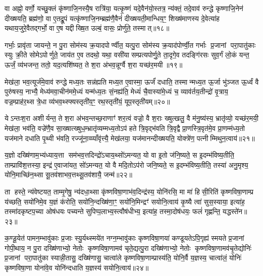 वा अह्नो॒ वर्णो॒ यच्छु॒क्लं कृ॑ष्णाजि॒नस्यै॒ष रात्रि॑या॒ यत्कृ॒ष्णं यदे॒वैन॑यो॒स्तत्र॒ न्य॑क्तं॒ तदे॒वाव॑ रुन्द्धे कृष्णाजि॒नेन॑ दीख्षयति॒ ब्रह्म॑णो॒ वा ए॒तद्रू॒पं यत्कृ॑ष्णाजि॒नम्ब्रह्म॑णै॒वैनं॑ दीख्षयती॒मान्धिय॒ꣳ॒ शिख्ष॑माणस्य दे॒वेत्या॑ह यथाय॒जुरे॒वैतद्गर्भो॒ वा ए॒ष यद्दीख्षि॒त उल्बं॒ वासः॒ प्रोर्णु॑ते॒ तस्मात्॥१८॥

गर्भाः॒ प्रावृ॑ता जायन्ते॒ न पु॒रा सोम॑स्य क्र॒यादपोर्ण्वीत॒ यत्पु॒रा सोम॑स्य क्र॒याद॑पोर्ण्वी॒त गर्भाः प्र॒जानां परा॒पातु॑काः स्युः क्री॒ते सोमेऽपोर्णुते॒ जाय॑त ए॒व तदथो॒ यथा॒ वसी॑यासम्प्रत्यपोर्णु॒ते ता॒दृगे॒व तदङ्गि॑रसः सुव॒र्गं लो॒कं यन्त॒ ऊर्जं॒ व्य॑भजन्त॒ ततो॒ यद॒त्यशि॑ष्यत॒ ते श॒रा अ॑भव॒न्नूर्ग्वै श॒रा यच्छ॑र॒मयी॥१९॥

मेख॑ला॒ भव॒त्यूर्ज॑मे॒वाव॑ रुन्द्धे मध्य॒तः सन्न॑ह्यति मध्य॒त ए॒वास्मा॒ ऊर्जं॑ दधाति॒ तस्मान्मध्य॒त ऊ॒र्जा भु॑ञ्जत ऊ॒र्ध्वं वै पुरु॑षस्य॒ नाभ्यै॒ मेध्य॑मवा॒चीन॑ममे॒ध्यं यन्म॑ध्य॒तः सं॒नह्य॑ति॒ मेध्यं॑ चै॒वास्या॑मे॒ध्यं च॒ व्याव॑र्तय॒तीन्द्रो॑ वृ॒त्राय॒ वज्र॒म्प्राह॑र॒थ्स त्रे॒धा व्य॑भव॒थ्स्फ्यस्तृती॑य॒ꣳ॒ रथ॒स्तृती॑यं॒ यूप॒स्तृती॑यम्॥२०॥

येऽन्तःश॒रा अशीर्यन्त॒ ते श॒रा अ॑भव॒न्तच्छ॒राणाꣳ॑ शर॒त्वं वज्रो॒ वै श॒राः ख्षुत्खलु॒ वै म॑नु॒ष्य॑स्य॒ भ्रातृ॑व्यो॒ यच्छ॑र॒मयी॒ मेख॑ला॒ भव॑ति॒ वज्रे॑णै॒व सा॒ख्षात्ख्षुध॒म्भ्रातृ॑व्यम्मध्य॒तोऽप॑ हते त्रि॒वृद्भ॑वति त्रि॒वृद्वै प्रा॒णस्त्रि॒वृत॑मे॒व प्रा॒णम्म॑ध्य॒तो यज॑माने दधाति पृ॒थ्वी भ॑वति॒ रज्जू॑ना॒व्व्याँवृ॑त्त्यै॒ मेख॑लया॒ यज॑मानन्दीख्षयति॒ योक्त्रे॑ण॒ पत्नीम्मिथुन॒त्वाय॑॥२१॥

य॒ज्ञो दख्षि॑णाम॒भ्य॑ध्याय॒त्ता सम॑भव॒त्तदिन्द्रो॑ऽचाय॒थ्सो॑ऽमन्यत॒ यो वा इ॒तो ज॑नि॒ष्यते॒ स इ॒दम्भ॑विष्य॒तीति॒ ताम्प्रावि॑श॒त्तस्या॒ इन्द्र॑ ए॒वाजा॑यत॒ सो॑ऽमन्यत॒ यो वै मदि॒तोऽप॑रो जनि॒ष्यते॒ स इ॒दम्भ॑विष्य॒तीति॒ तस्या॑ अनु॒मृश्य॒ योनि॒माच्छि॑न॒थ्सा सू॒तव॑शाभव॒त्तथ्सू॒तव॑शायै॒ जन्म॑॥२२॥

ता हस्ते॒ न्य॑वेष्टयत॒ ताम्मृ॒गेषु॒ न्य॑दधा॒थ्सा कृ॑ष्णविषा॒णाभ॑व॒दिन्द्र॑स्य॒ योनि॑रसि॒ मा मा॑ हिसी॒रिति॑ कृष्णविषा॒णाम्प्र य॑च्छति॒ सयो॑निमे॒व य॒ज्ञं क॑रोति॒ सयो॑नि॒न्दख्षि॑णा॒ꣳ॒ सयो॑नि॒मिन्द्रꣳ॑ सयोनि॒त्वाय॑ कृ॒ष्यै त्वा॑ सुस॒स्याया॒ इत्या॑ह॒ तस्मा॑दकृष्टप॒च्या ओष॑धयः पच्यन्ते सुपिप्प॒लाभ्य॒स्त्वौष॑धीभ्य॒ इत्या॑ह॒ तस्मा॒दोष॑धयः॒ फलं॑ गृह्णन्ति॒ यद्धस्ते॑न॥२३॥

क॒ण्डू॒येत॑ पामन॒म्भावु॑काः प्र॒जाः स्यु॒र्यथ्स्मये॑त नग्न॒म्भावु॑काः कृष्णविषा॒णया॑ कण्डूयतेऽपि॒गृह्य॑ स्मयते प्र॒जानां गोपी॒थाय॒ न पु॒रा दख्षि॑णाभ्यो॒ नेतोः कृष्णविषा॒णामव॑ चृते॒द्यत्पु॒रा दख्षि॑णाभ्यो॒ नेतोः कृष्णविषा॒णामव॑चृ॒तेद्योनिः॑ प्र॒जानां परा॒पातु॑का स्यान्नी॒तासु॒ दख्षि॑णासु॒ चात्वा॑ले कृष्णविषा॒णाम्प्रास्य॑ति॒ योनि॒र्वै य॒ज्ञस्य॒ चात्वा॑लं॒ योनिः॑ कृष्णविषा॒णा योना॑वे॒व योनि॑न्दधाति य॒ज्ञस्य॑ सयोनि॒त्वाय॑॥२४॥

